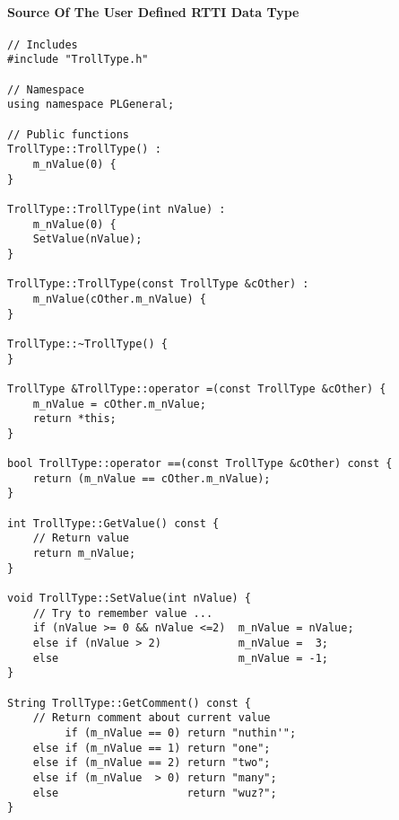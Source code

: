 \paragraph{Source Of The User Defined RTTI Data Type}
\begin{lstlisting}[label=Code:UserDefinedRTTIDataTypeSource,caption={Source of the user defined RTTI data type}]
// Includes
#include "TrollType.h"

// Namespace
using namespace PLGeneral;

// Public functions
TrollType::TrollType() :
	m_nValue(0) {
}

TrollType::TrollType(int nValue) :
	m_nValue(0) {
	SetValue(nValue);
}

TrollType::TrollType(const TrollType &cOther) :
	m_nValue(cOther.m_nValue) {
}

TrollType::~TrollType() {
}

TrollType &TrollType::operator =(const TrollType &cOther) {
	m_nValue = cOther.m_nValue;
	return *this;
}

bool TrollType::operator ==(const TrollType &cOther) const {
	return (m_nValue == cOther.m_nValue);
}

int TrollType::GetValue() const {
	// Return value
	return m_nValue;
}

void TrollType::SetValue(int nValue) {
	// Try to remember value ...
	if (nValue >= 0 && nValue <=2)	m_nValue = nValue;
	else if (nValue > 2)			m_nValue =  3;
	else							m_nValue = -1;
}

String TrollType::GetComment() const {
	// Return comment about current value
		 if (m_nValue == 0)	return "nuthin'";
	else if (m_nValue == 1)	return "one";
	else if (m_nValue == 2)	return "two";
	else if (m_nValue  > 0)	return "many";
	else					return "wuz?";
}
\end{lstlisting}
